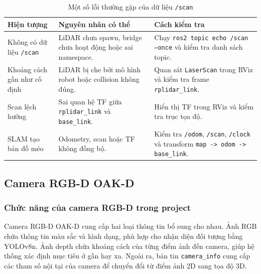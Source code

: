 \begin{table}[H]
    \centering
    \caption{Một số lỗi thường gặp của dữ liệu \texttt{/scan}}
    \label{tab:scan-errors}
    \renewcommand{\arraystretch}{1.25}
    \small
    \begin{tabularx}{\textwidth}{|>{\raggedright\arraybackslash}p{}|>{\raggedright\arraybackslash}p{}|>{\raggedright\arraybackslash}X|}
        \hline
        \textbf{Hiện tượng} & \textbf{Nguyên nhân có thể} & \textbf{Cách kiểm tra} \\
        \hline
        Không có dữ liệu \texttt{/scan} & LiDAR chưa spawn, bridge chưa hoạt động hoặc sai namespace. & Chạy \texttt{ros2 topic echo /scan --once} và kiểm tra danh sách topic. \\
        \hline
        Khoảng cách gần như cố định & LiDAR bị che bởi mô hình robot hoặc collision không đúng. & Quan sát \texttt{LaserScan} trong RViz và kiểm tra frame \texttt{rplidar\_link}. \\
        \hline
        Scan lệch hướng & Sai quan hệ TF giữa \texttt{rplidar\_link} và \texttt{base\_link}. & Hiển thị TF trong RViz và kiểm tra trục tọa độ. \\
        \hline
        SLAM tạo bản đồ méo & Odometry, scan hoặc TF không đồng bộ. & Kiểm tra \texttt{/odom}, \texttt{/scan}, \texttt{/clock} và transform \texttt{map -> odom -> base\_link}. \\
        \hline
    \end{tabularx}
\end{table}

\subsection{Camera RGB-D OAK-D}
\label{subsec:rgbd-camera}

\subsubsection{Chức năng của camera RGB-D trong project}
\label{subsubsec:rgbd-function}

Camera RGB-D OAK-D cung cấp hai loại thông tin bổ sung cho nhau. Ảnh RGB chứa thông tin màu sắc và hình dạng, phù hợp cho nhận diện đối tượng bằng YOLOv8n. Ảnh depth chứa khoảng cách của từng điểm ảnh đến camera, giúp hệ thống xác định mục tiêu ở gần hay xa. Ngoài ra, bản tin \texttt{camera\_info} cung cấp các tham số nội tại của camera để chuyển đổi từ điểm ảnh 2D sang tọa độ 3D.

